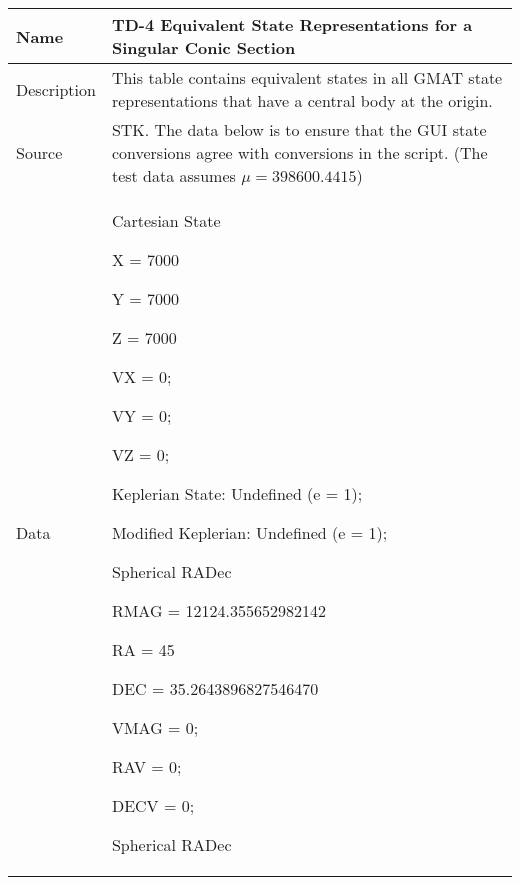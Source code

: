 

\begin{table}[htbp!]
\centering
      \begin{tabular}{|p{1.0 in} |p{5.0 in} |}
         \hline
          \rowcolor[rgb]{0.8,0.8,0.8}  Name & TD-4 Equivalent State Representations for a Singular Conic Section\\
         \hline
         Description & This table contains equivalent states in all GMAT state representations
         that have a central body at the origin.    \\ \hline
         Source &  STK.  The data below is to ensure that the GUI state conversions agree with conversions in the script. (The test data assumes $\mu = 398600.4415$)\\
         \hline
         Data &
          \begin{compactenum}
              \item Cartesian State
              \begin{compactenum}
                   \item X  = 7000
                   \item Y  = 7000
                   \item Z  = 7000
                   \item VX = 0;
                   \item VY = 0;
                   \item VZ = 0;
              \end{compactenum}
              \item Keplerian State: Undefined (e = 1);
              \item Modified Keplerian: Undefined (e = 1);
              \item Spherical RADec
             \begin{compactenum}
                 \item RMAG = 12124.355652982142
                 \item RA   = 45
                 \item DEC  = 35.2643896827546470
                 \item VMAG = 0;
                 \item RAV  = 0;
                 \item DECV = 0;
              \end{compactenum}
              \item Spherical RADec
               \begin{compactenum}

\end{compactenum}
\end{compactenum}
\end{tabular}
\end{table}
